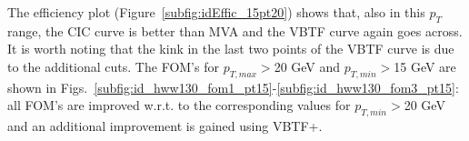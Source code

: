 The efficiency plot (Figure~\ref{subfig:idEffic_15pt20}) shows that, also in this $p_T$ range, the CIC curve is better than MVA and
the VBTF curve again goes across. It is worth noting that the kink in the last two points of the VBTF curve is due to the additional cuts.
The FOM's for $p_{T,max}>$20 GeV and $p_{T,min}>$15 GeV are shown in Figs.~\ref{subfig:id_hww130_fom1_pt15}-\ref{subfig:id_hww130_fom3_pt15}:
all FOM's are improved w.r.t. to the corresponding values for $p_{T,min}>$20 GeV and an additional improvement is gained using VBTF+.

\begin{figure}[!hbtp]
\\
\\

\end{figure}
